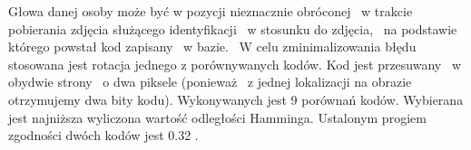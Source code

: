 Głowa danej osoby może być w pozycji nieznacznie obróconej ~w trakcie pobierania zdjęcia służącego identyfikacji ~w stosunku do zdjęcia, ~na podstawie  którego powstał kod zapisany  ~w bazie. ~W celu zminimalizowania błędu stosowana jest rotacja jednego z porównywanych kodów. Kod jest przesuwany ~w obydwie strony ~o dwa piksele (ponieważ ~z jednej lokalizacji na obrazie otrzymujemy dwa bity kodu). Wykonywanych jest 9 porównań kodów. Wybierana jest najniższa wyliczona wartość odległości Hamminga. Ustalonym progiem zgodności dwóch kodów jest 0.32 \cite{Daugman}.

